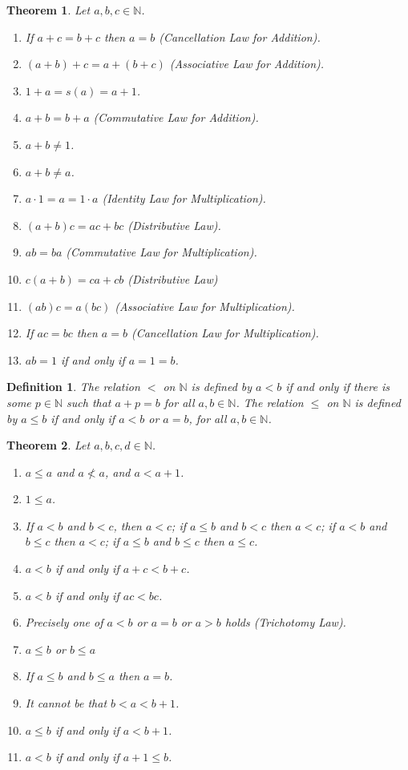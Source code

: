 \documentclass{article}
\newtheorem{theorem}{Theorem}
\newtheorem*{definition}{Definition}
\newcommand{\N}{\mathbb{N}}
\begin{document}
\begin{theorem}
	Let $a, b, c \in \N$.
	\begin{enumerate}
		\item If $a + c = b + c$ then $a = b$ (Cancellation Law for Addition).
		\item $(a + b) + c = a + (b + c)$ (Associative Law for Addition).
		\item $1 + a = s(a) = a + 1$.
		\item $a + b = b + a$ (Commutative Law for Addition).
		\item $a + b \ne 1$.
		\item $a + b \ne a$.
		\item $a \cdot 1 = a = 1\cdot a$ (Identity Law for Multiplication).
		\item $(a + b)c = ac + bc$ (Distributive Law).
		\item $ab = ba$ (Commutative Law for Multiplication).
		\item $c(a + b) = ca + cb$ (Distributive Law)
		\item $(ab)c = a(bc)$ (Associative Law for Multiplication).
		\item If $ac = bc$ then $a = b$ (Cancellation Law for Multiplication).
		\item $ab = 1$ if and only if $a = 1 = b$.
	\end{enumerate}
\end{theorem}

\begin{definition}
	The relation $<$ on $\N$ is defined by $a < b$ if and only if there is some $p \in \N$ such that $a + p = b$ for all $a,b \in \N$. The relation $\le$ on $\N$ is defined by $a \le b$ if and only if $a < b$ or $a = b$, for all $a, b \in \N$.
\end{definition}

\begin{theorem}
	Let $a,b,c,d \in \N$.
	\begin{enumerate}
		\item $a \le a$ and $a \nless a$, and $a < a + 1$.
		\item $1 \le a$.
		\item If $a < b$ and $b < c$, then $a < c$; if $a \le b$ and $b < c$ then $a < c$; if $a < b$ and $b \le c$ then $a < c$; if $a \le b$ and $b \le c$ then $a \le c$.
		\item $a < b$ if and only if $a + c < b + c$.
		\item $a < b$ if and only if $ac < bc$.
		\item Precisely one of $a < b$ or $a = b$ or $a > b$ holds (Trichotomy Law).
		\item $a \le b$ or $b \le a$
		\item If $a \le b$ and $b \le a$ then $a = b$.
		\item It cannot be that $b < a < b + 1$.
		\item $a \le b$ if and only if $a < b + 1$.
		\item $a < b$ if and only if $a + 1 \le b$.
	\end{enumerate}
\end{theorem}
\end{document}
